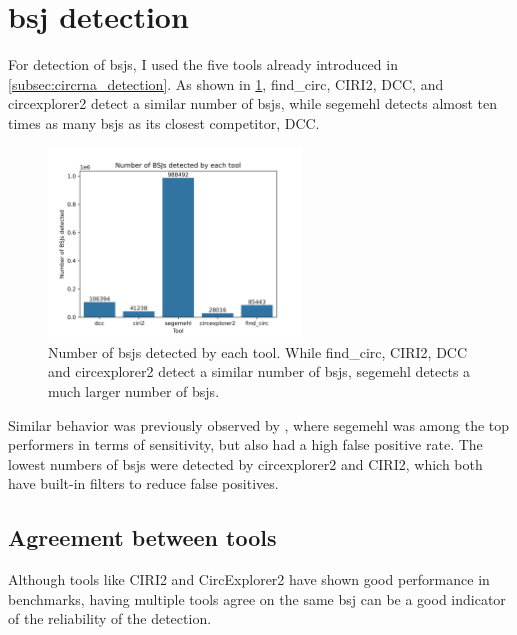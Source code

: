 \section{\Acrfull{bsj} detection}

For detection of \glspl{bsj}, I used the five tools already introduced in
\cref{subsec:circrna_detection}.
As shown in \cref{fig:detection_bars}, find\_circ, CIRI2, DCC, and
circexplorer2 detect a similar number of \glspl{bsj}, while segemehl detects
almost ten times as many \glspl{bsj} as its closest competitor, DCC.

\begin{figure}[H] \centering

    \includegraphics[width=0.6\textwidth]{chapters/4_results_and_discussion/figures/detection/n_bsjs_detected.png}
    \caption{Number of \glspl{bsj} detected by each tool.
        While find\_circ, CIRI2, DCC and circexplorer2 detect a similar number of
        \glspl{bsj}, segemehl detects a much larger number of \glspl{bsj}.
    }
    \label{fig:detection_bars}
\end{figure}
Similar behavior was previously observed by \textcite{zeng_comprehensive_2017},
where segemehl was among the top performers in terms of sensitivity, but also
had a high false positive rate.
The lowest numbers of \glspl{bsj} were detected by circexplorer2 and CIRI2,
which both have built-in filters to reduce false
positives\supercite{zhang_diverse_2016,gao_circular_2018}.

\subsection{Agreement between tools}

Although tools like CIRI2 and CircExplorer2 have shown good performance in
benchmarks, having multiple tools agree on the same \gls{bsj} can be a good
indicator of the reliability of the detection.

